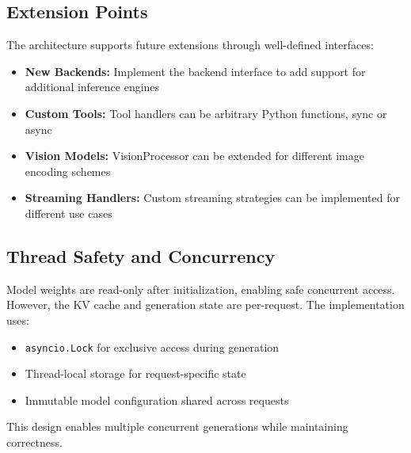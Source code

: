\subsection{Extension Points}

The architecture supports future extensions through well-defined interfaces:

\begin{itemize}
    \item \textbf{New Backends:} Implement the backend interface to add support for additional inference engines
    \item \textbf{Custom Tools:} Tool handlers can be arbitrary Python functions, sync or async
    \item \textbf{Vision Models:} VisionProcessor can be extended for different image encoding schemes
    \item \textbf{Streaming Handlers:} Custom streaming strategies can be implemented for different use cases
\end{itemize}

\subsection{Thread Safety and Concurrency}

Model weights are read-only after initialization, enabling safe concurrent access. However, the KV cache and generation state are per-request. The implementation uses:\

\begin{itemize}
    \item \texttt{asyncio.Lock} for exclusive access during generation
    \item Thread-local storage for request-specific state
    \item Immutable model configuration shared across requests
\end{itemize}

This design enables multiple concurrent generations while maintaining correctness.
